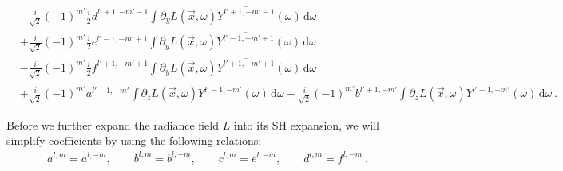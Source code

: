 \documentclass{egpubl}
\newcommand{\ud}{\,\mathrm{d}} %
\begin{document}
\begin{align*}
\\&
-\frac{i}{\sqrt{2}}\left({-1}\right)^{m'}\frac{i}{2}d^{{l'+1,-m'-1}}\int{\partial_yL\left (\vec{x} ,\omega \right )\overline{Y^{l'+1, -m'-1}}(\omega )\ud\omega}
\\&
+\frac{i}{\sqrt{2}}\left({-1}\right)^{m'}\frac{i}{2}e^{{l'-1,-m'+1}}\int{\partial_yL\left (\vec{x} ,\omega \right )\overline{Y^{l'-1, -m'+1}}(\omega )\ud\omega}
\\&
-\frac{i}{\sqrt{2}}\left({-1}\right)^{m'}\frac{i}{2}f^{{l'+1,-m'+1}}\int{\partial_yL\left (\vec{x} ,\omega \right )\overline{Y^{l'+1, -m'+1}}(\omega )\ud\omega}
\\&
+\frac{i}{\sqrt{2}}\left({-1}\right)^{m'}a^{{l'-1,-m'}}\int{\partial_zL\left (\vec{x} ,\omega \right )\overline{Y^{l'-1, -m'}}(\omega )\ud\omega}+\frac{i}{\sqrt{2}}\left({-1}\right)^{m'}b^{{l'+1,-m'}}\int{\partial_zL\left (\vec{x} ,\omega \right )\overline{Y^{l'+1, -m'}}(\omega )\ud\omega} \ .
\end{align*}

Before we further expand the radiance field $L$ into its SH expansion, we will simplify coefficients by using the following relations:
\begin{align}
a^{l,m} = a^{l,-m}, \qquad
b^{l,m} = b^{l,-m}, \qquad
c^{l,m} = e^{l,-m}, \qquad
d^{l,m} = f^{l,-m} \ .
\label{eq:recursion_identities}
\end{align}
\end{document}
